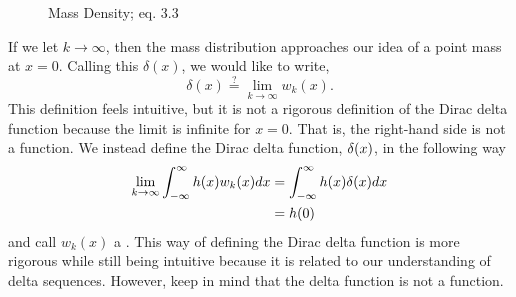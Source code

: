 \begin{figure}
    \centering
    \caption{Mass Density;  eq. 3.3}
\end{figure}

If we let \(k \rightarrow \infty\), then the mass distribution approaches our idea of a point mass at \(x=0\). Calling this \(\delta(x)\), we would like to write,
\begin{equation} \label{eq:deltaSeqLim}
    \delta(x) \overset{?}{=} \lim_{k\rightarrow \infty} w_k(x).
\end{equation}
This definition feels intuitive, but it is not a rigorous definition of the Dirac delta function because the limit is infinite for \(x=0\). That is, the right-hand side is not a function. We instead define the Dirac delta function, \(\delta(x)\), in the following way
\begin{equation}
    \begin{split}
        \lim_{k\rightarrow \infty}\int_{-\infty}^{\infty} h(x)w_k(x)dx &= \int_{-\infty}^{\infty} h(x)\delta(x)dx \\
        &= h(0)
    \end{split}
\end{equation}
and call \(w_k(x)\) a . This way of defining the Dirac delta function is more rigorous while still being intuitive because it is related to our understanding of delta sequences. However, keep in mind that the delta function is not a function.

